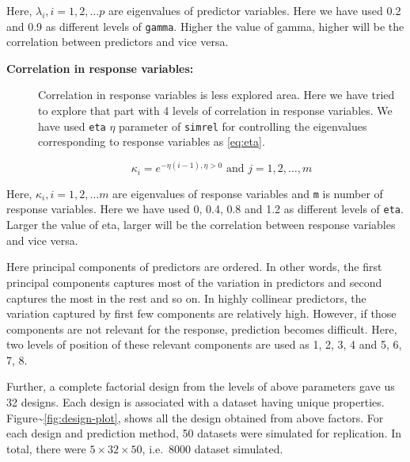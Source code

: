 \documentclass[12pt,3p,authoryear]{elsarticle}
\providecommand{\tightlist}{%
  \setlength{\itemsep}{0pt}\setlength{\parskip}{0pt}}
\theoremstyle{definition}
\theoremstyle{definition}
\theoremstyle{definition}
\theoremstyle{remark}
\begin{document}
Here, \(\lambda_i, i = 1, 2, \ldots p\) are eigenvalues of predictor
variables. Here we have used 0.2 and 0.9 as different levels of
\texttt{gamma}. Higher the value of gamma, higher will be the
correlation between predictors and vice versa.

\begin{description}
\item[\textbf{Correlation in response variables:}]
Correlation in response variables is less explored area. Here we have
tried to explore that part with 4 levels of correlation in response
variables. We have used \texttt{eta} \(\eta\) parameter of
\texttt{simrel} for controlling the eigenvalues corresponding to
response variables as \eqref{eq:eta}.

\begin{equation}
  \kappa_i = e^{-\eta(i - 1), \eta > 0} \text{ and } j = 1, 2, \ldots, m
  \label{eq:eta}
\end{equation}
\end{description}

Here, \(\kappa_i, i = 1, 2, \ldots m\) are eigenvalues of response
variables and \texttt{m} is number of response variables. Here we have
used 0, 0.4, 0.8 and 1.2 as different levels of \texttt{eta}. Larger the
value of eta, larger will be the correlation between response variables
and vice versa.

\begin{description}
\tightlist
\item[\textbf{Position of predictor components relevant to the
response:}]
Here principal components of predictors are ordered. In other words, the
first principal components captures most of the variation in predictors
and second captures the most in the rest and so on. In highly collinear
predictors, the variation captured by first few components are
relatively high. However, if those components are not relevant for the
response, prediction becomes difficult. Here, two levels of position of
these relevant components are used as 1, 2, 3, 4 and 5, 6, 7, 8.
\end{description}

Further, a complete factorial design from the levels of above parameters
gave us 32 designs. Each design is associated with a dataset having
unique properties. Figure\textasciitilde{}\ref{fig:design-plot}, shows
all the design obtained from above factors. For each design and
prediction method, 50 datasets were simulated for replication. In total,
there were \(5 \times 32 \times 50\), i.e.~8000 dataset simulated.
\end{document}
